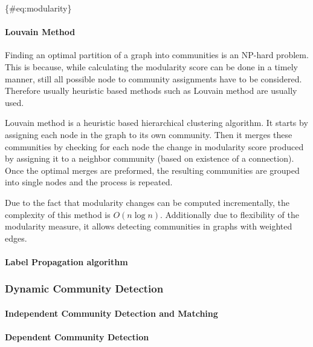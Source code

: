 \documentclass[
acmsmall,
nonacm,
screen,
acmthm]{../../scripts/pandoc/templates/acmart}
\begin{document}
\{\#eq:modularity\}

\hypertarget{louvain-method}{%
\paragraph{Louvain Method}\label{louvain-method}}

Finding an optimal partition of a graph into communities is an NP-hard
problem. This is because, while calculating the modularity score can be
done in a timely manner, still all possible node to community
assignments have to be considered. Therefore usually heuristic based
methods such as Louvain method are usually used.

Louvain method \citep{blondelFastUnfoldingCommunities2008} is a
heuristic based hierarchical clustering algorithm. It starts by
assigning each node in the graph to its own community. Then it merges
these communities by checking for each node the change in modularity
score produced by assigning it to a neighbor community (based on
existence of a connection). Once the optimal merges are preformed, the
resulting communities are grouped into single nodes and the process is
repeated.

Due to the fact that modularity changes can be computed incrementally,
the complexity of this method is \(O(n \log n)\). Additionally due to
flexibility of the modularity measure, it allows detecting communities
in graphs with weighted edges.

\hypertarget{label-propagation-algorithm}{%
\paragraph{Label Propagation
algorithm}\label{label-propagation-algorithm}}

\hypertarget{dynamic-community-detection}{%
\subsubsection{Dynamic Community
Detection}\label{dynamic-community-detection}}

\hypertarget{independent-community-detection-and-matching}{%
\paragraph{Independent Community Detection and
Matching}\label{independent-community-detection-and-matching}}

\hypertarget{dependent-community-detection}{%
\paragraph{Dependent Community
Detection}\label{dependent-community-detection}}
\end{document}
